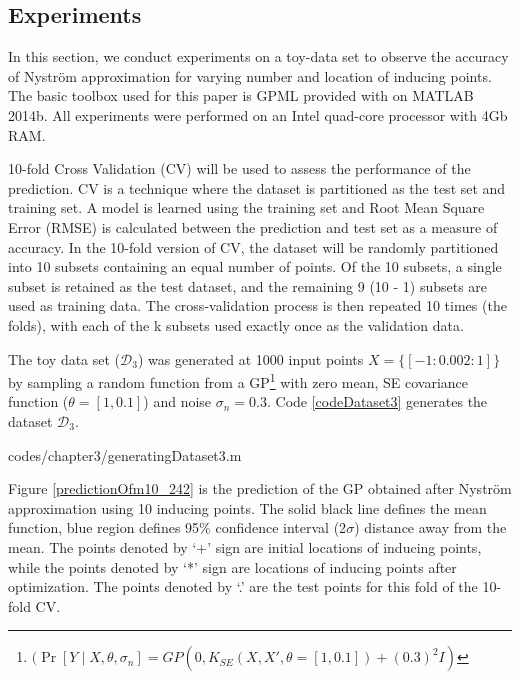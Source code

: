 \subsection{Experiments}\label{subsecNystromExperiments}
In this section, we conduct experiments on a toy-data set to observe the accuracy of Nystr\"{o}m approximation for varying number and location of inducing points. The basic toolbox used for this paper is GPML provided with \cite{rasmussen2006gaussian} on MATLAB 2014b. All experiments were performed on an Intel quad-core processor with 4Gb RAM. 

10-fold Cross Validation (CV) will be used to assess the performance of the prediction. CV is a technique where the dataset is partitioned as the test set and training set. A model is learned using the training set and Root Mean Square Error (RMSE) is calculated between the prediction and test set as a measure of accuracy. In the 10-fold version of CV, the dataset will be randomly partitioned into 10 subsets containing an equal number of points. Of the 10 subsets, a single subset is retained as the test dataset, and the remaining 9 (10 - 1) subsets are used as training data. The cross-validation process is then repeated 10 times (the folds), with each of the k subsets used exactly once as the validation data.

The toy data set ($\mathcal{D}_{3}$) was generated at 1000 input points $X = \{[-1:0.002:1]\}$ by sampling a random function from a GP\footnote{$(\Pr[Y \mid X, \theta, \sigma_{n}] = GP(0, K_{SE}(X, X', \theta = [1, 0.1]) + (0.3)^{2}I)$} with zero mean, SE covariance function ($\theta = [1, 0.1]$) and noise $\sigma_{n} = 0.3$. Code \ref{codeDataset3} generates the dataset $\mathcal{D}_{3}$.

\begin{mdframed}[hidealllines=true,backgroundcolor=lightgray!20]

                    {codes/chapter3/generatingDataset3.m}
\end{mdframed}

Figure \ref{predictionOfm10_242} is the prediction of the GP obtained after Nystr\"{o}m approximation using 10 inducing points. The solid black line defines the mean function, blue region defines 95\% confidence interval (2$\sigma$) distance away from the mean. The points denoted by `+' sign are initial locations of inducing points, while the points denoted by `*' sign are locations of inducing points after optimization. The points denoted by `.' are the test points for this fold of the 10-fold CV. 

